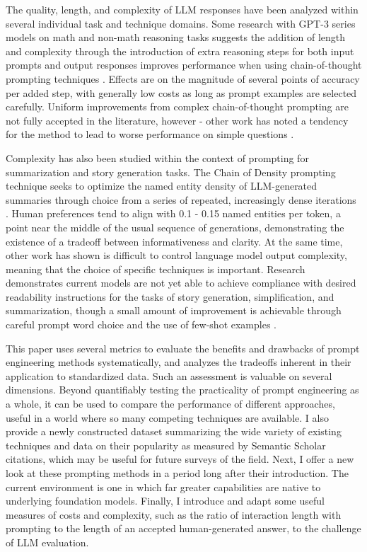 \documentclass[11pt]{article}
\begin{document}
The quality, length, and complexity of LLM responses have been analyzed within several individual task and technique domains. Some research with GPT-3 series models on math and non-math reasoning tasks suggests the addition of length and complexity through the introduction of extra reasoning steps for both input prompts and output responses improves performance when using chain-of-thought prompting techniques \cite{fu_complexity-based_2023}. Effects are on the magnitude of several points of accuracy per added step, with generally low costs as long as prompt examples are selected carefully. Uniform improvements from complex chain-of-thought prompting are not fully accepted in the literature, however - other work has noted a tendency for the method to lead to worse performance on simple questions \cite{shum_automatic_2023}.

Complexity has also been studied within the context of prompting for summarization and story generation tasks. The Chain of Density prompting technique seeks to optimize the named entity density of LLM-generated summaries through choice from a series of repeated, increasingly dense iterations \cite{adams_sparse_2023}. Human preferences tend to align with 0.1 - 0.15 named entities per token, a point near the middle of the usual sequence of generations, demonstrating the existence of a tradeoff between informativeness and clarity. At the same time, other work has shown is difficult to control language model output complexity, meaning that the choice of specific techniques is important. Research demonstrates current models are not yet able to achieve compliance with desired readability instructions for the tasks of story generation, simplification, and summarization, though a small amount of improvement is achievable through careful prompt word choice and the use of few-shot examples \cite{pu_chatgpt_2023, imperial_flesch_2023}.

This paper uses several metrics to evaluate the benefits and drawbacks of prompt engineering methods systematically, and analyzes the tradeoffs inherent in their application to standardized data. Such an assessment is valuable on several dimensions. Beyond quantifiably testing the practicality of prompt engineering as a whole, it can be used to compare the performance of different approaches, useful in a world where so many competing techniques are available. I also provide a newly constructed dataset summarizing the wide variety of existing techniques and data on their popularity as measured by Semantic Scholar citations, which may be useful for future surveys of the field. Next, I offer a new look at these prompting methods in a period long after their introduction. The current environment is one in which far greater capabilities are native to underlying foundation models. Finally, I introduce and adapt some useful measures of costs and complexity, such as the ratio of interaction length with prompting to the length of an accepted human-generated answer, to the challenge of LLM evaluation.
\end{document}
